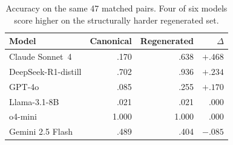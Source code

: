 \begin{table}[t]
\centering
\caption{Accuracy on the same 47 matched pairs. Four of six models score higher on the
structurally harder regenerated set.}
\label{tab:bw-accuracy}
\small
\begin{tabular}{lrrr}
\toprule
Model & Canonical & Regenerated & $\Delta$ \\
\midrule
Claude Sonnet~4 & .170 & .638 & $+.468$ \\
DeepSeek-R1-distill & .702 & .936 & $+.234$ \\
GPT-4o & .085 & .255 & $+.170$ \\
Llama-3.1-8B & .021 & .021 & $.000$ \\
o4-mini & 1.000 & 1.000 & $.000$ \\
Gemini 2.5 Flash & .489 & .404 & $-.085$ \\
\bottomrule
\end{tabular}
\end{table}
